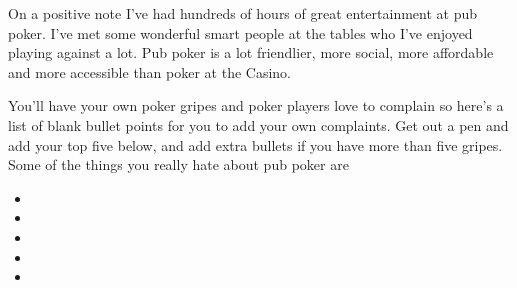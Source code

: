 On a positive note I've
had hundreds of hours of great entertainment at pub poker. I've
met some wonderful smart people at the tables who I've enjoyed playing
against a lot. Pub poker is a lot friendlier, more social, more affordable
and more accessible than poker at the Casino.

You'll have your own poker gripes and poker players love to complain
so here's a list of blank bullet points for you to add your own
complaints. Get out a pen and add your top five below, and add extra
bullets if you have more than five gripes. Some of the things you
really hate about pub poker are

\begin{itemize}

\item


\item


\item


\item


\item


\end{itemize}
